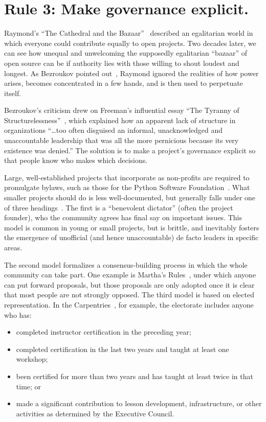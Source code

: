 \documentclass[10pt,letterpaper]{article}
\newcommand{\rulemajor}[1]{\section*{#1}}
\begin{document}
\rulemajor{Rule 3: Make governance explicit.}

Raymond's ``The Cathedral and the Bazaar''~\cite{raymond2001}
described an egalitarian world in which everyone could contribute equally to open projects.
Two decades later,
we can see how unequal and unwelcoming the supposedly egalitarian ``bazaar'' of open source can be
if authority lies with those willing to shout loudest and longest.
As Bezroukov pointed out~\cite{bezroukov1999},
Raymond ignored the realities of how power arises,
becomes concentrated in a few hands,
and is then used to perpetuate itself.

Bezroukov's criticism drew on Freeman's influential essay ``The Tyranny of Structurelessness''~\cite{freeman1972},
which explained how an apparent lack of structure in organizations ``{\ldots}too often disguised an informal,
unacknowledged and unaccountable leadership that was all the more pernicious because its very existence was denied.''
The solution is to make a project's governance explicit
so that people know who makes which decisions.

Large, well-established projects that incorporate as non-profits are required to promulgate bylaws,
such as those for the Python Software Foundation~\cite{psf-bylaws}.
What smaller projects should do is less well-documented,
but generally falls under one of three headings~\cite{fogel2005}.
The first is a ``benevolent dictator'' (often the project founder),
who the community agrees has final say on important issues.
This model is common in young or small projects,
but is brittle,
and inevitably fosters the emergence of unofficial (and hence unaccountable) de facto leaders
in specific areas.

The second model formalizes a consensus-building process
in which the whole community can take part.
One example is Martha's Rules~\cite{minahan1986},
under which anyone can put forward proposals,
but those proposals are only adopted once it is clear that most people are not strongly opposed.
The third model is based on elected representation.
In the Carpentries~\cite{carpentries-bylaws},
for example,
the electorate includes anyone who has:

\begin{itemize}

\item
  completed instructor certification in the preceding year;

\item
  completed certification in the last two years and taught at least one workshop;

\item
  been certified for more than two years and has taught at least twice in that time;
  or

\item
  made a significant contribution to lesson development, infrastructure, or other activities
  as determined by the Executive Council.

\end{itemize}
\end{document}
